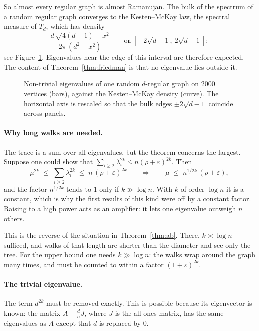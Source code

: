 \documentclass[11pt,letterpaper]{article}
\theoremstyle{definition}
\theoremstyle{remark}
\newcommand{\edge}{2\sqrt{d-1}}
\newcommand{\eps}{\varepsilon}
\begin{document}
So almost every regular graph is almost Ramanujan. The bulk of the spectrum of a random regular
graph converges to the Kesten--McKay law, the spectral measure of $T_d$, which has density
\[
  \frac{d\,\sqrt{4(d-1)-x^2}}{2\pi\,(d^2-x^2)}\qquad\text{on } [-\edge,\ \edge];
\]
see Figure~\ref{fig:spectrum}. Eigenvalues near the edge of this interval are therefore expected.
The content of Theorem~\ref{thm:friedman} is that no eigenvalue lies outside it.

\begin{figure}[ht]
  \centering
  
  \caption{Non-trivial eigenvalues of one random $d$-regular graph on $2000$ vertices (bars),
  against the Kesten--McKay density (curve). The horizontal axis is rescaled so that the bulk
  edges $\pm\edge$ coincide across panels.}
  \label{fig:spectrum}
\end{figure}

\paragraph{Why long walks are needed.}
The trace is a sum over all eigenvalues, but the theorem concerns the largest. Suppose one could
show that $\sum_{i\ge2}\lambda_i^{2k}\le n(\rho+\eps)^{2k}$. Then
\begin{equation}\label{eq:amplifier}
  \mu^{2k}\;\le\;\sum_{i\ge 2}\lambda_i^{2k}\;\le\;n\,(\rho+\eps)^{2k}
  \qquad\Longrightarrow\qquad
  \mu\;\le\;n^{1/2k}\,(\rho+\eps),
\end{equation}
and the factor $n^{1/2k}$ tends to $1$ only if $k\gg\log n$. With $k$ of order $\log n$ it is a
constant, which is why the first results of this kind were off by a constant factor. Raising to
a high power acts as an amplifier: it lets one eigenvalue outweigh $n$ others.

This is the reverse of the situation in Theorem~\ref{thm:ab}. There, $k\asymp\log n$ sufficed,
and walks of that length are shorter than the diameter and see only the tree. For the upper bound
one needs $k\gg\log n$: the walks wrap around the graph many times, and must be counted to within
a factor $(1+\eps)^{2k}$.

\paragraph{The trivial eigenvalue.}
The term $d^{2k}$ must be removed exactly. This is possible because its eigenvector is known: the
matrix $A-\tfrac dn J$, where $J$ is the all-ones matrix, has the same eigenvalues as $A$ except
that $d$ is replaced by $0$.
\end{document}
